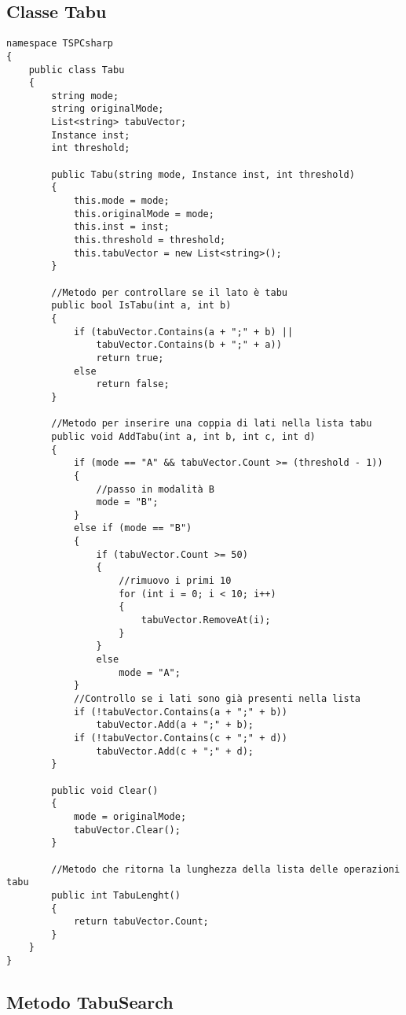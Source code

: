 \subsection{Classe Tabu}
\begin{lstlisting}
namespace TSPCsharp
{
    public class Tabu
    {
        string mode;
        string originalMode;
        List<string> tabuVector;
        Instance inst;
        int threshold;

        public Tabu(string mode, Instance inst, int threshold)
        {
            this.mode = mode;
            this.originalMode = mode;
            this.inst = inst;
            this.threshold = threshold;
            this.tabuVector = new List<string>();
        }

        //Metodo per controllare se il lato è tabu
        public bool IsTabu(int a, int b)
        {
            if (tabuVector.Contains(a + ";" + b) ||
                tabuVector.Contains(b + ";" + a))
                return true;
            else
                return false;
        }
		
		//Metodo per inserire una coppia di lati nella lista tabu
        public void AddTabu(int a, int b, int c, int d)
        {
            if (mode == "A" && tabuVector.Count >= (threshold - 1))
            {
                //passo in modalità B
                mode = "B";
            }
            else if (mode == "B")
            {
                if (tabuVector.Count >= 50)
                {
                    //rimuovo i primi 10
                    for (int i = 0; i < 10; i++)
                    {
                        tabuVector.RemoveAt(i);
                    }
                }
                else
                    mode = "A";
            }
            //Controllo se i lati sono già presenti nella lista
            if (!tabuVector.Contains(a + ";" + b))
                tabuVector.Add(a + ";" + b);
            if (!tabuVector.Contains(c + ";" + d))
                tabuVector.Add(c + ";" + d);
        }

        public void Clear()
        {
            mode = originalMode;
            tabuVector.Clear();
        }
		
		//Metodo che ritorna la lunghezza della lista delle operazioni tabu
        public int TabuLenght()
        {
            return tabuVector.Count;
        }
    }
}
\end{lstlisting}

\subsection{Metodo TabuSearch}

